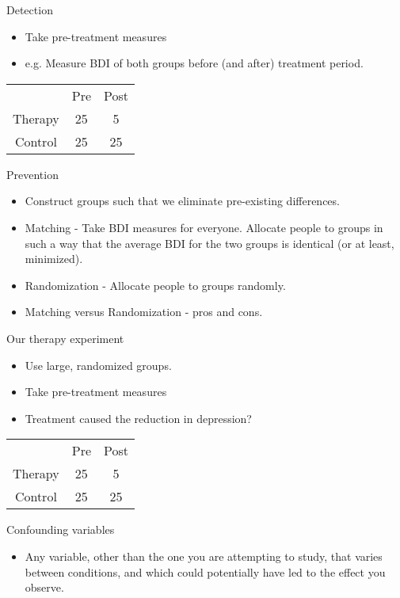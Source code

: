 \documentclass{beamer}
\begin{document}
\begin{frame}{Detection}
\begin{itemize}
\item Take pre-treatment measures
\item e.g. Measure BDI of both groups before (and after) treatment period.
\end{itemize}
\begin{tabular} {c c c}
			&	Pre	 &	Post \\
Therapy	&	25	&		5 \\
Control	&	25	&		25 \\
\end{tabular} 
\end{frame}

\begin{frame}{Prevention}
\begin{itemize}
\item Construct groups such that we eliminate pre-existing differences.
\item Matching - Take BDI measures for everyone. Allocate people to groups in such a way that the average BDI for the two groups is identical (or at least, minimized).
\item Randomization - Allocate people to groups randomly.
\item Matching versus Randomization - pros and cons.
\end{itemize}
\end{frame}

\begin{frame}{Our therapy experiment}
\begin{itemize}
\item Use large, randomized groups.
\item Take pre-treatment measures
\item Treatment caused the reduction in depression?
\end{itemize}
\vspace{12 pt}
\begin{tabular} {c c c}
			&	Pre	 &	Post \\
Therapy	&	25	&		5 \\
Control	&	25	&		25 \\
\end{tabular} 
\end{frame}

\begin{frame}{Confounding variables}
\begin{itemize}
\item Any variable, other than the one you are attempting to study, that varies between conditions, and which could potentially have led to the effect you observe.
\end{itemize}
\end{frame}
\end{document}
